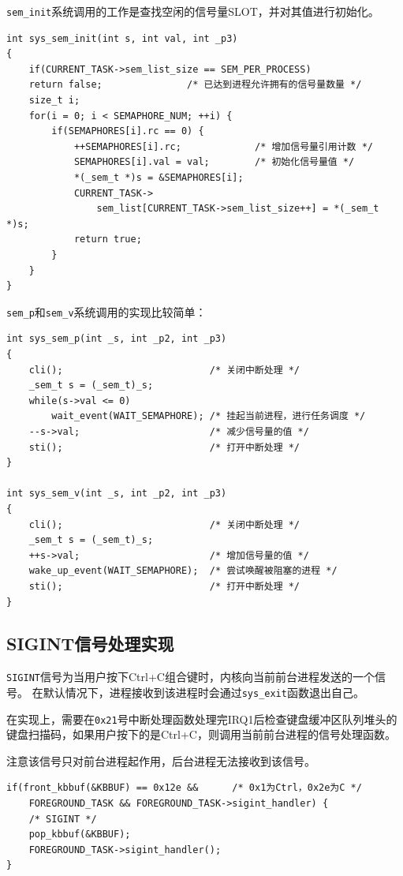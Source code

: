 \documentclass[a4paper, adobefonts]{ctexart}
\begin{document}
\verb|sem_init|系统调用的工作是查找空闲的信号量SLOT，并对其值进行初始化。

\begin{verbatim}
int sys_sem_init(int s, int val, int _p3)
{
    if(CURRENT_TASK->sem_list_size == SEM_PER_PROCESS)
    return false;               /* 已达到进程允许拥有的信号量数量 */
    size_t i;
    for(i = 0; i < SEMAPHORE_NUM; ++i) {
        if(SEMAPHORES[i].rc == 0) {
            ++SEMAPHORES[i].rc;             /* 增加信号量引用计数 */
            SEMAPHORES[i].val = val;        /* 初始化信号量值 */
            *(_sem_t *)s = &SEMAPHORES[i];
            CURRENT_TASK->
                sem_list[CURRENT_TASK->sem_list_size++] = *(_sem_t *)s;
            return true;
        }
    }
}
\end{verbatim}

\verb|sem_p|和\verb|sem_v|系统调用的实现比较简单：

\begin{verbatim}
int sys_sem_p(int _s, int _p2, int _p3)
{
    cli();                          /* 关闭中断处理 */
    _sem_t s = (_sem_t)_s;
    while(s->val <= 0)
        wait_event(WAIT_SEMAPHORE); /* 挂起当前进程，进行任务调度 */
    --s->val;                       /* 减少信号量的值 */
    sti();                          /* 打开中断处理 */
}

int sys_sem_v(int _s, int _p2, int _p3)
{
    cli();                          /* 关闭中断处理 */
    _sem_t s = (_sem_t)_s;
    ++s->val;                       /* 增加信号量的值 */
    wake_up_event(WAIT_SEMAPHORE);  /* 尝试唤醒被阻塞的进程 */
    sti();                          /* 打开中断处理 */
}
\end{verbatim}

\subsection{SIGINT信号处理实现}
\verb|SIGINT|信号为当用户按下Ctrl+C组合键时，内核向当前前台进程发送的一个信号。
在默认情况下，进程接收到该进程时会通过\verb|sys_exit|函数退出自己。

在实现上，需要在\verb|0x21|号中断处理函数处理完IRQ1后检查键盘缓冲区队列堆头的
键盘扫描码，如果用户按下的是Ctrl+C，则调用当前前台进程的信号处理函数。

注意该信号只对前台进程起作用，后台进程无法接收到该信号。

\begin{verbatim}
if(front_kbbuf(&KBBUF) == 0x12e &&      /* 0x1为Ctrl，0x2e为C */
    FOREGROUND_TASK && FOREGROUND_TASK->sigint_handler) {
    /* SIGINT */
    pop_kbbuf(&KBBUF);
    FOREGROUND_TASK->sigint_handler();
}
\end{verbatim}
\end{document}
